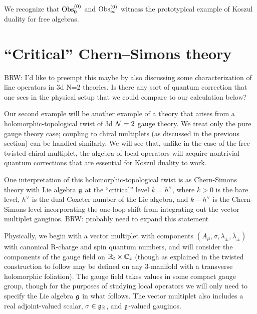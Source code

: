 \documentclass[11pt]{amsart}
\def\brian#1{{\textcolor{blue!65!red}{BRW: {#1}}}}
\begin{document}
We recognize that ${\rm Obs}_0^{(0)}$ and ${\rm Obs}_\infty^{(0)}$ witness the prototypical example of Koszul duality for free algebras. 




\section{``Critical'' Chern--Simons theory}\label{s:crit}

\brian{I'd like to preempt this maybe by also discussing some characterization of line operators in 3d N=2 theories. 
Is there any sort of quantum correction that one sees in the physical setup that we could compare to our calculation below?}

Our second example will be another example of a theory that arises from a holomorphic-topological twist of 3d $\mathcal N=2$ gauge theory. 
We treat only the pure gauge theory case; coupling to chiral multiplets (as discussed in the previous section) can be handled similarly. 
We will see that, unlike in the case of the free twisted chiral multiplet, the algebra of local operators will acquire nontrivial quantum corrections that are essential for Koszul duality to work. 

One interpretation of this holomorphic-topological twist is as Chern-Simons theory with Lie algebra $\mathfrak g$ at the ``critical'' level $k = h^{\vee}$, where $k > 0$ is the bare level, $h^{\vee}$ is the dual Coxeter number of the Lie algebra, and $k - h^{\vee}$ is the Chern-Simons level incorporating the one-loop shift from integrating out the vector multiplet gauginos.  \brian{probably need to expand this statement}

Physically, we begin with a vector multiplet with components $(A_{\mu}, \sigma, \lambda_{\pm}, \bar{\lambda}_{\pm})$ with canonical R-charge and spin quantum numbers, and will consider the components of the gauge field on $\mathbb R_t \times \mathbb C_{z}$ (though as explained in \cite{ACNV} the twisted construction to follow may be defined on any 3-manifold with a transverse holomorphic foliation). The gauge field takes values in some compact gauge group, though for the purposes of studying local operators we will only need to specify the Lie algebra $\mathfrak g$ in what follows. The vector multiplet also includes a real adjoint-valued scalar, $\sigma \in \mathfrak g_{\mathbb R}$, and $\mathfrak g$-valued gauginos. 
\end{document}
